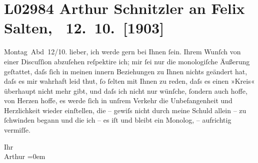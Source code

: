 

\section[ Arthur Schnitzler an Felix Salten, 12. 10. {[}1903{]}]{L02984 Arthur Schnitzler an Felix Salten,  12. 10. {[}1903{]}}
\nopagebreak{}
\rehead{ }\normalsize\beginnumbering{}
\toendnotes[C]{\smallbreak\pagebreak[2]}
\toendnotes[C]{\smallbreak}
\toendnotes[C]{\smallbreak}
\pstart
           \raggedleft{}{\pb}Montag Abd 12/10.\pend
           \vspace{0.5em}
\pstart
           lieber, ich werde \label{K_L02984-1v}\label{K_L02984-1} gern bei Ihnen{ }ſein. Ihrem Wunſch von einer Discuſſion abzuſehen reſpektire
               ich; mir{ }ſei nur die monologiſche Äußerung geſtattet, daſs{ }ſich in meinen innern
               Beziehungen zu Ihnen nichts geändert hat, daſs es mir wahrhaft leid thut,{ }ſo{ }ſelten
               mit Ihnen zu reden, daſs es {\pb}einen »Kreis«
               überhaupt nicht mehr gibt, und daſs ich nicht nur wünſche,{ }ſondern auch hoffe,  von Herzen hoffe, es werde{ }ſich in unſrem Verkehr
               die Unbefangenheit und Herzlichkeit wieder einſtellen, die – gewiſs nicht durch meine
               Schuld allein – zu{ }ſchwinden begann und die ich – es iſt {\pb}und bleibt ein Monolog, – aufrichtig
               vermiſſe.\pend
           
\pstart
           Ihr {\\[\baselineskip]}\spacefill\mbox{Arthur}\pend
           \leftskip=0em{}\endnumbering{}  \newcommand{\dateiname}{L02984}\newcommand{\titel}{Arthur Schnitzler an Felix Salten, 12. 10. [1903]}\newcommand{\editorInnen}{Martin Anton Müller und Laura Untner}

